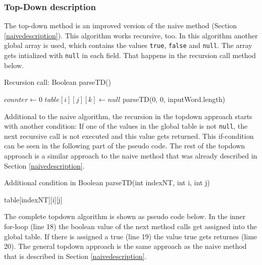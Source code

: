 \documentclass[a4paper, 11pt]{article}
\begin{document}


\subsubsection{Top-Down description}
\label{topdowndescription}


The top-down method is an improved version of the naive method (Section \ref{naivedescription}). This algorithm works recursive, too. In this algorithm another global array is used, which contains the values \texttt{true}, \texttt{false} and \texttt{null}. The array gets intialized with \texttt{null} in each field. That happens in the recursion call method below.

\begin{algorithm}[H]
\caption{Recursion call: Boolean parseTD()}\label{alg:cap}
\begin{algorithmic}[1]
\State $counter \gets 0$
\State $table[i][j][k] \gets null$
\EndFor
\EndFor
\EndFor
\State \Return parseTD(0, 0, inputWord.length)
\end{algorithmic}
\end{algorithm}

Additional to the naive algorithm, the recursion in the topdown approach starts with another condition: If one of the values in the global table is not \texttt{null}, the next recursive call is not executed and this value gets returned. This if-condition can be seen in the following part of the pseudo code. The rest of the topdown approach is a similar approach to the naive method that was already described in Section \ref{naivedescription}.

\begin{algorithm}[H]
\caption{Additional condition in Boolean parseTD(int indexNT, int i, int j)}\label{alg:cap}
\begin{algorithmic}[1]
\State \Return table[indexNT][i][j]
\EndIf
\end{algorithmic}
\end{algorithm}

The complete topdown algorithm is shown as pseudo code below. In the inner for-loop (line 18) the boolean value of the next method calls get assigned into the global table. If there is assigned a true (line 19) the value true gets returnes (lime 20). The general topdown approach is the same approach as the naive method that is described in Section \ref{naivedescription}.
\end{document}
